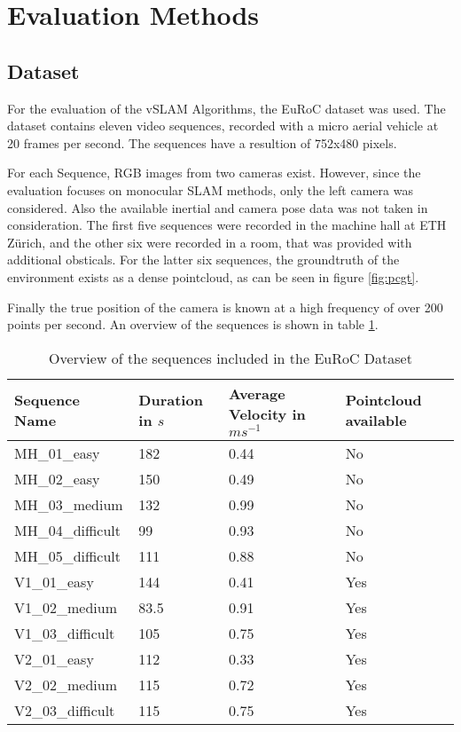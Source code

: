 \section{Evaluation Methods}

\subsection{Dataset}

	For the evaluation of the vSLAM Algorithms, the EuRoC dataset \cite{euroc} was used.
	The dataset contains eleven video sequences, recorded with a micro aerial vehicle at 20 frames per second.
	The sequences have a resultion of 752x480 pixels.
	
	For each Sequence, RGB images from two cameras exist. However, since the evaluation
	focuses on monocular SLAM methods, only the left camera was considered. Also the available 
	inertial and camera pose data was not taken in consideration. The first five sequences were recorded in 
	the machine hall at ETH Zürich, and the other six were recorded in a room, that was provided 
	with additional obsticals. For the latter six sequences, the groundtruth of the environment 
	exists as a dense pointcloud, as can be seen in figure \ref{fig:pcgt}.


	Finally the true position of the 
	camera is known at a high frequency of over 200 points per second. 
	An overview of the sequences is shown in table \ref{table:euroctable}.



	\begin{table}
	\caption{Overview of the sequences included in the EuRoC Dataset}
	\begin{tabular}{ |p{3cm}||p{3cm}|p{3cm}|p{3cm}|}
	\hline
	Sequence Name& Duration in $s$ & Average Velocity in $ms^{-1}$ &Pointcloud available\\
	\hline
	MH\_01\_easy & 182 & 0.44 & No\\
	MH\_02\_easy & 150 & 0.49 & No\\
	MH\_03\_medium & 132 & 0.99 & No\\
	MH\_04\_difficult & 99 & 0.93 & No\\
	MH\_05\_difficult & 111 & 0.88 & No\\
	V1\_01\_easy & 144 & 0.41 & Yes\\
	V1\_02\_medium & 83.5 & 0.91 & Yes\\
	V1\_03\_difficult & 105 & 0.75 & Yes\\
	V2\_01\_easy & 112 & 0.33 & Yes\\
	V2\_02\_medium & 115 & 0.72 & Yes\\
	V2\_03\_difficult & 115 & 0.75 & Yes\\
	\hline
	\end{tabular}
	\label{table:euroctable}
	\end{table}

